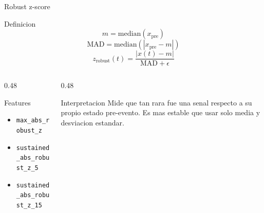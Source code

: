 \documentclass[10pt,aspectratio=169]{beamer}
\newcommand{\code}[1]{\texttt{\footnotesize #1}}
\begin{document}
\begin{frame}{Robust z-score}
\small
\begin{block}{Definicion}
\[
m = \mathrm{median}(x_{\mathrm{pre}})
\]
\[
\mathrm{MAD} = \mathrm{median}(|x_{\mathrm{pre}} - m|)
\]
\[
z_{\mathrm{robust}}(t) = \frac{|x(t)-m|}{\mathrm{MAD}+\epsilon}
\]
\end{block}
\begin{columns}[T,totalwidth=\textwidth]
\begin{column}{0.48\textwidth}
\begin{block}{Features}
\begin{itemize}
  \item \code{max\_abs\_robust\_z}
  \item \code{sustained\_abs\_robust\_z\_5}
  \item \code{sustained\_abs\_robust\_z\_15}
\end{itemize}
\end{block}
\end{column}
\begin{column}{0.48\textwidth}
\begin{exampleblock}{Interpretacion}
Mide que tan rara fue una senal respecto a su propio estado pre-evento. Es mas estable que usar solo media y desviacion estandar.
\end{exampleblock}
\end{column}
\end{columns}
\end{frame}
\end{document}
